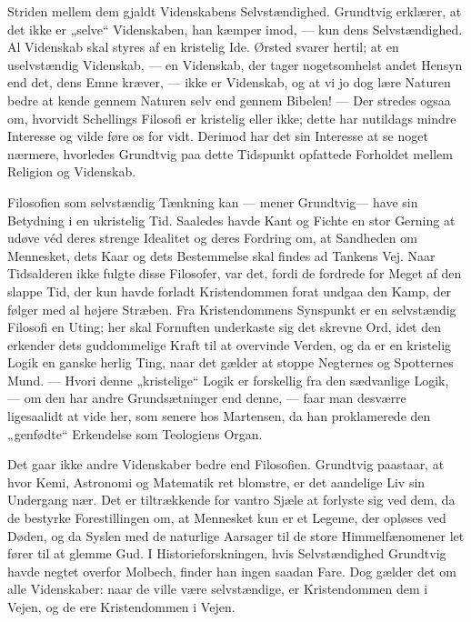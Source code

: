 \documentclass[12pt,a4paper,openany]{book}
\newcommand{\opage}[1]{\marginnote{\footnotesize\textit{[#1]}}}
\begin{document}
Striden mellem dem gjaldt Videnskabens Selvstændighed. Grundtvig erklærer, at
det ikke er „selve“ Videnskaben, han kæmper imod, --- kun dens Selvstændighed.
Al Videnskab skal styres af en kristelig Ide. Ørsted svarer hertil; at en
uselvstændig Videnskab, --- en Videnskab, der tager nogetsomhelst andet Hensyn
end det, dens Emne kræver, --- ikke er Videnskab, og at vi jo dog lære Naturen
bedre at kende gennem Naturen selv end gennem Bibelen! --- Der stredes ogsaa
om, hvorvidt Schellings Filosofi er kristelig eller ikke;
\setcounter{footnote}{0}%
\opage{62}dette har nutildags mindre Interesse og vilde føre os for vidt.
Derimod har det sin Interesse at se noget nærmere, hvorledes Grundtvig paa
dette Tidspunkt opfattede Forholdet mellem Religion og Videnskab.

Filosofien som selvstændig Tænkning kan --- mener Grundtvig--- have sin
Betydning i en ukristelig Tid. Saaledes havde Kant og Fichte en stor Gerning at
udøve véd deres strenge Idealitet og deres Fordring om, at Sandheden om
Mennesket, dets Kaar og dets Bestemmelse skal findes ad Tankens Vej. Naar
Tidsalderen ikke fulgte disse Filosofer, var det, fordi de fordrede for Meget
af den slappe Tid, der kun havde forladt Kristendommen forat undgaa den Kamp,
der følger med al højere Stræben. Fra Kristendommens Synspunkt er en
selvstændig Filosofi en Uting; her skal Fornuften underkaste sig det skrevne
Ord, idet den erkender dets guddommelige Kraft til at overvinde Verden, og da
er en kristelig Logik en ganske herlig Ting, naar det gælder at stoppe
Negternes og Spotternes Mund. --- Hvori denne „kristelige“ Logik er forskellig
fra den sædvanlige Logik, --- om den har andre Grundsætninger end denne, ---
faar man desværre ligesaalidt at vide her, som senere hos Martensen, da han
proklamerede den „genfødte“ Erkendelse som Teologiens Organ.

Det gaar ikke andre Videnskaber bedre end Filosofien. Grundtvig paastaar, at
hvor Kemi, Astronomi og Matematik ret blomstre, er det aandelige Liv sin
Undergang nær. Det er tiltrækkende for vantro Sjæle at forlyste sig ved dem, da
de bestyrke Forestillingen om, at Mennesket kun er et Legeme, der opløses ved
Døden, og da Syslen med de naturlige Aarsager til de store Himmelfænomener let
fører til at glemme Gud. I Historieforskningen, hvis Selvstændighed Grundtvig
havde negtet overfor Molbech, finder han ingen saadan Fare. Dog gælder det om
alle Videnskaber: naar de ville være selvstændige, er Kristendommen dem i
Vejen, og de ere Kristendommen i Vejen.
\end{document}
